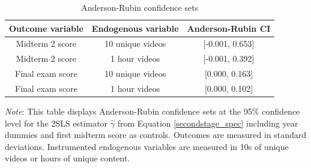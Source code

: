 \documentclass[12pt]{article}
\newcommand{\Fignote}[1]{
	\begin{tablenotes}[para,flushleft]\footnotesize
		\textit{Note}: #1
	\end{tablenotes}
}
\begin{document}
\clearpage


\clearpage
\begin{spacing}{1.0}
\begin{table} \centering \caption{Anderson-Rubin confidence sets}
\label{arci_table}
\begin{threeparttable}
\begin{tabular}{ ccc }
\toprule
Outcome variable & Endogenous variable & Anderson-Rubin CI \\
\midrule
Midterm 2 score & 10 unique videos & [-0.001, 0.653] \\
Midterm 2 score & 1 hour videos & [-0.001, 0.392] \\
Final exam score & 10 unique videos & [0.000, 0.163] \\
Final exam score & 1 hour videos & [0.000, 0.102] \\
\bottomrule
\end{tabular}
\Fignote{This table displays Anderson-Rubin confidence sets at the 95\% confidence level for the 2SLS estimator $\hat{\gamma}$ from Equation \ref{secondstage_spec} including year dummies and first midterm score as controls. Outcomes are measured in standard deviations. Instrumented endogenous variables are measured in 10s of unique videos or hours of unique content.}
\end{threeparttable}
\end{table}
\end{spacing}

\clearpage

\end{document}
